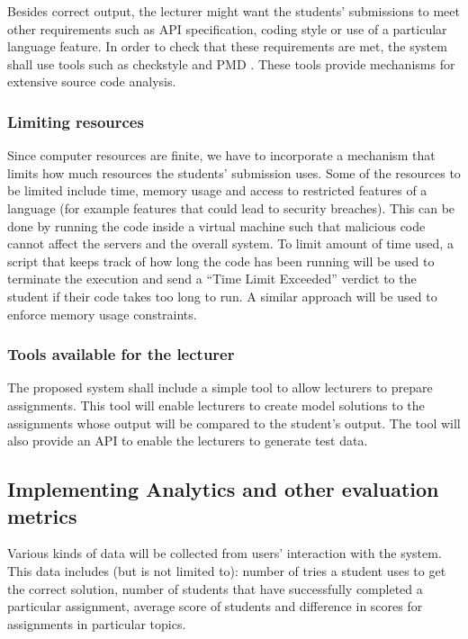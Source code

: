\documentclass[12pt]{article}
\begin{document}
		Besides correct output, the lecturer might want the students' submissions to meet other requirements such as API specification, coding style or use of a particular language feature. In order to check that these requirements are met, the system shall use tools such as checkstyle \cite{checkstyle} and PMD \cite{pmd}. These tools provide mechanisms for extensive source code analysis.
		\subsubsection{Limiting resources}
		Since computer resources are finite, we have to incorporate a mechanism that limits how much resources the students' submission uses. Some of the resources to be limited include time, memory usage and access to restricted features of a language (for example features that could lead to security breaches). This can be done by running the code inside a virtual machine such that malicious code cannot affect the servers and the overall system. To limit amount of time used, a script that keeps track of how long the code has been running will be used to terminate the execution and send a “Time Limit Exceeded” verdict to the student if their code takes too long to run. A similar approach will be used to enforce memory usage constraints.
		\subsubsection{Tools available for the lecturer}
		The proposed system shall include a simple tool to allow lecturers to prepare assignments. This tool will enable lecturers to create model solutions to the assignments whose output will be compared to the student’s output. The tool will also provide an API to enable the lecturers to generate test data.
	\subsection{Implementing Analytics and other evaluation metrics}
	Various kinds of data will be collected from users' interaction with the system. This data includes (but is not limited to): number of tries a student uses to get the correct solution, number of students that have successfully completed a particular assignment, average score of students and difference in scores for assignments in particular topics.
	
\end{document}
